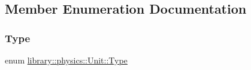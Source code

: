 \subsection{Member Enumeration Documentation}
\mbox{\label{classlibrary_1_1physics_1_1_unit_ab01b0024991fd80f3e5ef7c8282fccc1}} 
\subsubsection{\texorpdfstring{Type}{Type}}
{\footnotesize\ttfamily enum \hyperlink{classlibrary_1_1physics_1_1_unit_ab01b0024991fd80f3e5ef7c8282fccc1}{library\+::physics\+::\+Unit\+::\+Type}\hspace{0.3cm}{\ttfamily [strong]}}

